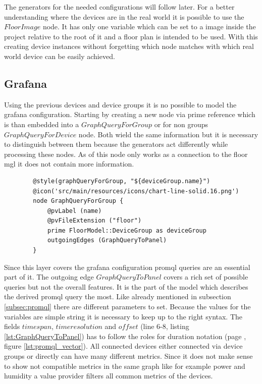 The generators for the needed configurations will follow later. For a better understanding where the devices are in the real world it is possible to use the $FloorImage$ node. It has only one variable which can be set to a image inside the project relative to the root of it and a floor plan is intended to be used. With this creating device instances without forgetting which node matches with which real world device can be easily achieved.

\subsection{Grafana}

Using the previous devices and device groups it is no possible to model the grafana configuration. Starting by creating a new node via prime reference which is than embedded into a $GraphQueryForGroup$ or for non groups $GraphQueryForDevice$ node. Both wield the same information but it is necessary to distinguish between them because the generators act differently while processing these nodes. As of this node only works as a connection to the floor \gls{mgl} it does not contain more information. 

\begin{listing}[H]
	\begin{verbatim}
		@style(graphQueryForGroup, "${deviceGroup.name}")
		@icon('src/main/resources/icons/chart-line-solid.16.png')
		node GraphQueryForGroup {
			@pvLabel (name)
			@pvFileExtension ("floor")
			prime FloorModel::DeviceGroup as deviceGroup
			outgoingEdges (GraphQueryToPanel)
		}
	\end{verbatim}
\end{listing}

Since this layer covers the grafana configuration \gls{promql} queries are an essential part of it. The outgoing edge $GraphQueryToPanel$ covers a rich set of possible queries but not the overall features. It is the part of the model which describes the derived \gls{promql} query the most. Like already mentioned in subsection \ref{subsec:promql} there are different parameters to set. Because the values for the variables are simple string it is necessary to keep up to the right syntax. The fields $timespan$, $timeresolution$ and $offset$ (line 6-8, listing \ref{lst:GraphQueryToPanel}) has to follow the roles for duration notation (page \pageref{lst:promql_vector}, figure \ref{lst:promql_vector}). All connected devices either connected via device groups or directly can have many different metrics. Since it does not make sense to show not compatible metrics in the same graph like for example power and humidity a value provider filters all common metrics of the devices. 

